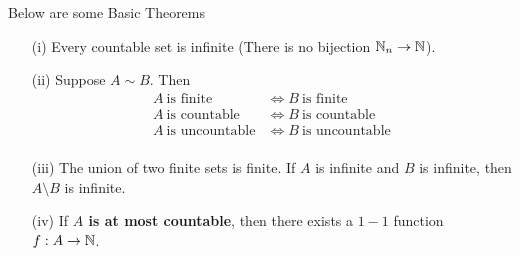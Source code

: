 \documentclass[a4paper]{report}
\begin{document}
Below are some Basic Theorems 
\begin{enumerate}
    \item[(i)] Every countable set is infinite (There is no bijection \( {\mathbb{N}}_{n} \to \mathbb{N}  \)).
    \item[(ii)] Suppose \( A \sim B  \). Then
        \begin{align*}
            A \  \text{is finite} &\iff B \  \text{is finite} \\
            A \  \text{is countable} &\iff B \  \text{is countable} \\
            A \  \text{is uncountable} &\iff B \  \text{is uncountable} \\
        \end{align*}
    \item[(iii)] The union of two finite sets is finite. If \( A  \) is infinite and \( B  \) is infinite, then \( A \setminus  B   \) is infinite. 
    \item[(iv)] If \textbf{\( A  \) is at most countable}, then there exists a \( 1-1 \) function \( f: A \to \mathbb{N}  \).
\end{enumerate} 
\end{document}
